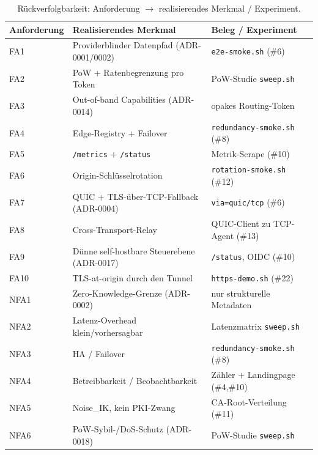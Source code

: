 \begin{table}[t]
  \centering
  \caption{Rückverfolgbarkeit: Anforderung $\rightarrow$ realisierendes Merkmal / Experiment.}
  \label{tab:traceability}
  \begin{tabular}{lll}
    \toprule
    Anforderung & Realisierendes Merkmal & Beleg / Experiment \\
    \midrule
    FA1  & Providerblinder Datenpfad (ADR-0001/0002) & \texttt{e2e-smoke.sh} (\#6) \\
    FA2  & PoW + Ratenbegrenzung pro Token           & PoW-Studie \texttt{sweep.sh} \\
    FA3  & Out-of-band Capabilities (ADR-0014)       & opakes Routing-Token \\
    FA4  & Edge-Registry + Failover                  & \texttt{redundancy-smoke.sh} (\#8) \\
    FA5  & \texttt{/metrics} + \texttt{/status}      & Metrik-Scrape (\#10) \\
    FA6  & Origin-Schlüsselrotation                  & \texttt{rotation-smoke.sh} (\#12) \\
    FA7  & QUIC + TLS-über-TCP-Fallback (ADR-0004)   & \texttt{via=quic/tcp} (\#6) \\
    FA8  & Cross-Transport-Relay                     & QUIC-Client zu TCP-Agent (\#13) \\
    FA9  & Dünne self-hostbare Steuerebene (ADR-0017)& \texttt{/status}, OIDC (\#10) \\
    FA10 & TLS-at-origin durch den Tunnel            & \texttt{https-demo.sh} (\#22) \\
    NFA1 & Zero-Knowledge-Grenze (ADR-0002)          & nur strukturelle Metadaten \\
    NFA2 & Latenz-Overhead klein/vorhersagbar        & Latenzmatrix \texttt{sweep.sh} \\
    NFA3 & HA / Failover                             & \texttt{redundancy-smoke.sh} (\#8) \\
    NFA4 & Betreibbarkeit / Beobachtbarkeit          & Zähler + Landingpage (\#4,\#10) \\
    NFA5 & Noise\_IK, kein PKI-Zwang                 & CA-Root-Verteilung (\#11) \\
    NFA6 & PoW-Sybil-/DoS-Schutz (ADR-0018)          & PoW-Studie \texttt{sweep.sh} \\
    \bottomrule
  \end{tabular}
\end{table}
